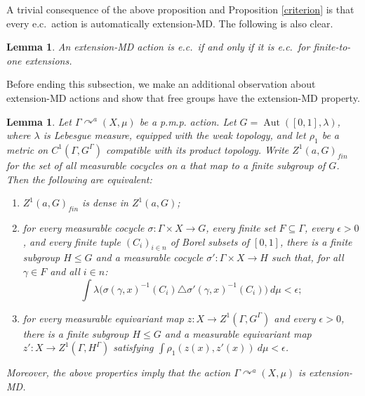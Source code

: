 \documentclass[12pt]{amsart}
\newtheorem{lem}[thm]{Lemma}
\theoremstyle{definition}
\DeclareMathOperator{\Aut}{Aut}
\newcommand{\pmp}{p{$.$}m{$.$}p{$.$}}
\newcommand{\acts}{\curvearrowright}
\newcommand{\symd}{\triangle}
\begin{document}
A trivial consequence of the above proposition and Proposition \ref{criterion} is that every e.c.\ action is automatically extension-MD. The following is also clear.

\begin{lem}\label{weakMDlemma}
An extension-MD action is e.c.\ if and only if it is e.c.\ for finite-to-one extensions. 
\end{lem}

Before ending this subsection, we make an additional observation about extension-MD actions and show that free groups have the extension-MD property.

\begin{lem} \label{lem:exMD}
    Let $\Gamma \acts^a (X, \mu)$ be a {\pmp} action. Let $G = \Aut([0,1], \lambda)$, where $\lambda$ is Lebesgue measure, equipped with the weak topology, and let $\rho_1$ be a metric on $C^1(\Gamma, G^\Gamma)$ compatible with its product topology. Write $Z^1(a, G)_{fin}$ for the set of all measurable cocycles on $a$ that map to a finite subgroup of $G$. Then the following are equivalent:
    \begin{enumerate}
        \item \label{item:exMD2} $Z^1(a, G)_{fin}$ is dense in $Z^1(a, G)$;
        \item \label{item:exMD3} for every measurable cocycle $\sigma : \Gamma \times X \rightarrow G$, every finite set $F \subseteq \Gamma$, every $\epsilon > 0$, and every finite tuple $(C_i)_{i \in n}$ of Borel subsets of $[0,1]$, there is a finite subgroup $H \leq G$ and a measurable cocycle $\sigma' : \Gamma \times X \rightarrow H$ such that, for all $\gamma \in F$ and all $i \in n$:
            \[ \int \lambda \big(\sigma(\gamma,x)^{-1}(C_i) \symd \sigma'(\gamma, x)^{-1}(C_i) \big) \ d \mu < \epsilon;\]
        \item \label{item:exMD4} for every measurable equivariant map $z : X \rightarrow Z^1(\Gamma, G^\Gamma)$ and every $\epsilon > 0$, there is a finite subgroup $H \leq G$ and a measurable equivariant map $z' : X \rightarrow Z^1(\Gamma, H^\Gamma)$ satisfying $\int \rho_1(z(x),z'(x)) \ d \mu < \epsilon$.
    \end{enumerate}
    Moreover, the above properties imply that the action $\Gamma \acts^a (X, \mu)$ is extension-MD.
\end{lem}
\end{document}
